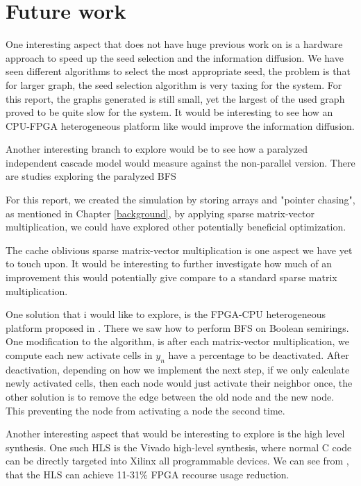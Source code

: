 \chapter{Future work} \label{futureWork}
One interesting aspect that does not have huge previous work on is a hardware approach to speed up the seed selection and the information diffusion. We have seen different algorithms to select the most appropriate seed, the problem is that for larger graph, the seed selection algorithm is very taxing for the system. For this report, the graphs generated is still small, yet the largest of the used graph proved to be quite slow for the system. It would be interesting to see how an CPU-FPGA heterogeneous platform like \cite{HybridBFS2015} would improve the information diffusion. 

Another interesting branch to explore would be to see how a paralyzed independent cascade model would measure against the non-parallel version. There are studies exploring the paralyzed BFS \cite{ParallelBFS2011}

For this report, we created the simulation by storing arrays and "pointer chasing", as mentioned in Chapter \ref{background}, by applying sparse matrix-vector multiplication, we could have explored other potentially beneficial optimization. 

The cache oblivious sparse matrix-vector multiplication is one aspect we have yet to touch upon. It would be interesting to further investigate how much of an improvement this would potentially give compare to a standard sparse matrix multiplication.


One solution that i would like to explore, is the FPGA-CPU heterogeneous platform proposed in \cite{HybridBFS2015}. There we saw how to perform BFS on Boolean semirings. One modification to the algorithm, is after each matrix-vector multiplication, we compute each new activate cells in $y_n$ have a percentage to be deactivated. After deactivation, depending on how we implement the next step, if we only calculate newly activated cells, then each node would just activate their neighbor once, the other solution is to remove the edge between the old node and the new node. This preventing the node from activating a node the second time.

Another interesting aspect that would be interesting to explore is the high level synthesis. One such HLS is the Vivado high-level synthesis, where normal C code can be directly targeted into Xilinx all programmable devices. We can see from \cite{HLS2011}, that the HLS can achieve 11-31\% FPGA recourse usage reduction. 